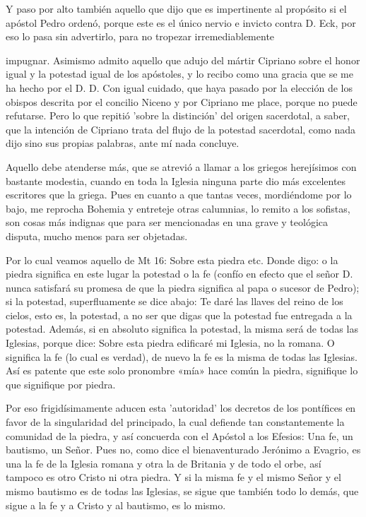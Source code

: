 Y paso por alto también aquello que dijo que es impertinente al propósito si el apóstol Pedro ordenó, porque este es el único nervio \marginpar{\small[272]} e invicto contra D. Eck, por eso lo pasa sin advertirlo, para no tropezar irremediablemente

impugnar. Asimismo admito aquello que adujo del mártir Cipriano sobre el honor igual y la potestad igual de los apóstoles, y lo recibo como una gracia que se me ha hecho por el D. D. Con igual cuidado, que haya pasado por la elección de los obispos descrita por el concilio Niceno y por Cipriano me place, porque no puede refutarse. Pero lo que repitió 'sobre la distinción' del origen sacerdotal, a saber, que la intención de Cipriano trata del flujo de la potestad sacerdotal, como nada dijo sino sus propias palabras, ante mí nada concluye.

Aquello debe atenderse más, que se atrevió a llamar a los griegos herejísimos con bastante modestia, cuando en toda la Iglesia ninguna parte dio más excelentes escritores que la griega. Pues en cuanto a que tantas veces, mordiéndome por lo bajo, me reprocha Bohemia y entreteje otras calumnias, lo remito a los sofistas, son cosas más indignas que para ser mencionadas en una grave y teológica disputa, mucho menos para ser objetadas.

Por lo cual veamos aquello de Mt 16: Sobre esta piedra etc. Donde digo: o la piedra significa en este lugar la potestad o la fe (confío en efecto que el señor D. nunca satisfará su promesa de que la piedra significa al papa o sucesor de Pedro); si la potestad, superfluamente se dice abajo: Te daré las llaves del reino de los cielos, esto es, la potestad, a no ser que digas que la potestad fue entregada a la potestad. Además, si en absoluto significa la potestad, la misma será de todas las Iglesias, porque dice: Sobre esta piedra edificaré mi Iglesia, no la romana. O significa la fe (lo cual es verdad), de nuevo la fe es la misma de todas las Iglesias. Así es patente que este solo pronombre «mía» hace común la piedra, signifique lo que signifique por piedra.

Por eso frigidísimamente aducen esta 'autoridad' los decretos de los pontífices en favor de la singularidad del principado, la cual defiende tan constantemente la comunidad de la piedra, y así concuerda con el Apóstol a los Efesios: Una fe, un bautismo, un Señor. Pues no, como dice el bienaventurado Jerónimo a Evagrio, es una la fe de la Iglesia romana y otra la de Britania y de todo el orbe, así tampoco es otro Cristo ni otra piedra. Y si la misma fe y el mismo Señor y el mismo bautismo es de todas las Iglesias, se sigue que también todo lo demás, que sigue a la fe y a Cristo y al bautismo, es lo mismo.

